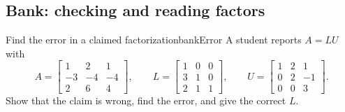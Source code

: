 \documentclass[11pt]{article}
\begin{document}
\subsection*{Bank: checking and reading factors}

\begin{exmp}{Find the error in a claimed factorization}{bankError}
A student reports $A=LU$ with
\[
A=\begin{bmatrix}1&2&1\\-3&-4&-4\\2&6&4\end{bmatrix},\qquad L=\begin{bmatrix}1&0&0\\3&1&0\\2&1&1\end{bmatrix},\qquad U=\begin{bmatrix}1&2&1\\0&2&-1\\0&0&3\end{bmatrix}.
\]
Show that the claim is wrong, find the error, and give the correct $L$.


\end{exmp}
\end{document}
